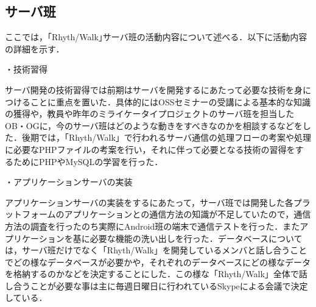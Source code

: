 \subsection{サーバ班}
\par
ここでは，｢Rhyth/Walk｣サーバ班の活動内容について述べる．以下に活動内容の詳細を示す．
\par
・技術習得
\par
サーバ開発の技術習得では前期はサーバを開発するにあたって必要な技術を身につけることに重点を置いた．具体的にはOSSセミナーの受講による基本的な知識の獲得や，教員や昨年のミライケータイプロジェクトのサーバ班を担当したOB・OGに，今のサーバ班はどのような動きをすべきなのかを相談するなどをした．後期では，「Rhyth/Walk」で行われるサーバ通信の処理フローの考案や処理に必要なPHPファイルの考案を行い，それに伴って必要となる技術の習得をするためにPHPやMySQLの学習を行った．
\par
・アプリケーションサーバの実装
\par
アプリケーションサーバの実装をするにあたって，サーバ班では開発した各プラットフォームのアプリケーションとの通信方法の知識が不足していたので，通信方法の調査を行ったのち実際にAndroid班の端末で通信テストを行った．またアプリケーションを基に必要な機能の洗い出しを行った．データベースについては，サーバ班だけでなく「Rhyth/Walk」を開発しているメンバと話し合うことでどの様なデータベースが必要かや，それぞれのデータベースにどの様なデータを格納するのかなどを決定することにした．この様な「Rhyth/Walk」全体で話し合うことが必要な事は主に毎週日曜日に行われているSkypeによる会議で決定している．
\par
{}
